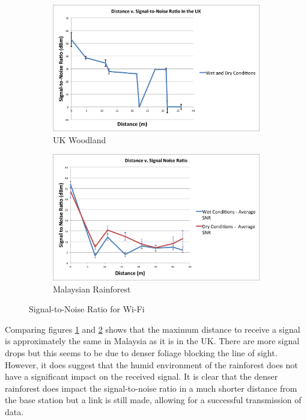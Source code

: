 \begin{figure}
\centering
\begin{subfigure}{.5\textwidth}
  \centering
  \includegraphics[width=\linewidth]{Chap3/figures/bp_snr.png}
  \caption{UK Woodland}
	\label{cardiffsnr}
\end{subfigure}%
\begin{subfigure}{.5\textwidth}
  \centering
  \includegraphics[width=\linewidth]{Chap3/figures/dg_snr.png}
  \caption{Malaysian Rainforest}
 \label{malaysiasnr}
\end{subfigure}
\caption{Signal-to-Noise Ratio for Wi-Fi}
\label{fig:test}
\end{figure}
						
			Comparing figures \ref{cardiffsnr} and \ref{malaysiasnr} shows that the maximum distance to receive a signal is approximately the same in Malaysia as it is in the UK.  There are more signal drops but this seems to be due to denser foliage blocking the line of sight. However, it does suggest that the humid environment of the rainforest does not have a significant impact on the received signal. It is clear that the denser rainforest does impact the signal-to-noise ratio in a much shorter distance from the base station but a link is still made, allowing for a successful transmission of data.
			
